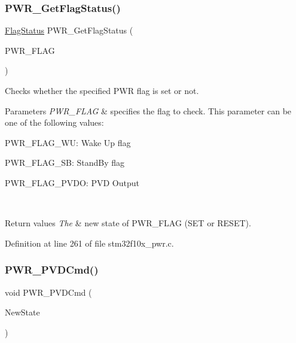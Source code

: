 \subsubsection{\texorpdfstring{P\+W\+R\+\_\+\+Get\+Flag\+Status()}{PWR\_GetFlagStatus()}}
{\footnotesize\ttfamily \hyperlink{group___exported__types_ga89136caac2e14c55151f527ac02daaff}{Flag\+Status} P\+W\+R\+\_\+\+Get\+Flag\+Status (\begin{DoxyParamCaption}\item[{uint32\+\_\+t}]{P\+W\+R\+\_\+\+F\+L\+AG }\end{DoxyParamCaption})}



Checks whether the specified P\+WR flag is set or not. 


\begin{DoxyParams}{Parameters}
{\em P\+W\+R\+\_\+\+F\+L\+AG} & specifies the flag to check. This parameter can be one of the following values\+: \begin{DoxyItemize}
\item P\+W\+R\+\_\+\+F\+L\+A\+G\+\_\+\+WU\+: Wake Up flag \item P\+W\+R\+\_\+\+F\+L\+A\+G\+\_\+\+SB\+: Stand\+By flag \item P\+W\+R\+\_\+\+F\+L\+A\+G\+\_\+\+P\+V\+DO\+: P\+VD Output \end{DoxyItemize}
\\
\hline
\end{DoxyParams}

\begin{DoxyRetVals}{Return values}
{\em The} & new state of P\+W\+R\+\_\+\+F\+L\+AG (S\+ET or R\+E\+S\+ET). \\
\hline
\end{DoxyRetVals}


Definition at line 261 of file stm32f10x\+\_\+pwr.\+c.

\mbox{\label{group___p_w_r___private___functions_ga42cad476b816e0a33594a933b3ed1acd}} 
\subsubsection{\texorpdfstring{P\+W\+R\+\_\+\+P\+V\+D\+Cmd()}{PWR\_PVDCmd()}}
{\footnotesize\ttfamily void P\+W\+R\+\_\+\+P\+V\+D\+Cmd (\begin{DoxyParamCaption}\item[{\hyperlink{group___exported__types_gac9a7e9a35d2513ec15c3b537aaa4fba1}{Functional\+State}}]{New\+State }\end{DoxyParamCaption})}



